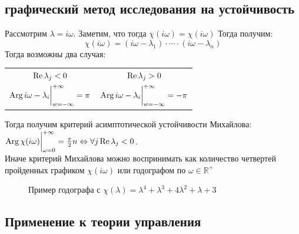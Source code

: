 \subsection{графический метод исследования на устойчивость} 
Рассмотрим $\lambda = i \omega$. Заметим, что тогда $\overline{\chi}(i\omega) = \chi(i\omega)$
Тогда получим:
\begin{equation*}
\chi(i \omega) = (i \omega - \lambda_1)\cdot \cdots \cdot (i \omega - \lambda_n)
\end{equation*}
Тогда возможны два случая: \\
\begin{center}
	\begin{tabular}{cc}
		$\operatorname{Re}{\lambda_j} < 0$ & $\operatorname{Re}{\lambda_j} > 0$\\
		$\operatorname{Arg}{i \omega - \lambda_i} \bigg|_{w = - \infty}^{+\infty}\bigg.	= \pi$ & $\operatorname{Arg}{i \omega - \lambda_i} \bigg|_{w = - \infty}^{+\infty}\bigg.	= -\pi$
	\end{tabular}
\end{center}
Тогда получим критерий асимптотической устойчивости Михайлова:\\
$\operatorname{Arg}{\chi(i \omega)}\bigg|_{\omega = 0}^{+\infty} = \frac{\pi}{2} n \Leftrightarrow \forall j \operatorname{Re}{\lambda_j} < 0$.\\
Иначе критерий Михайлова можно воспринимать как количество четвертей пройденных графиком $\chi(i\omega)$ или годографом по $\omega \in \mathbb{R}^+$ 
\begin{figure}[H]
	\caption{ Пример годографа с $\chi(\lambda) = \lambda^4+\lambda^3+4\lambda^2+\lambda+3$}
\end{figure}
\subsection{Применение к теории управления}
